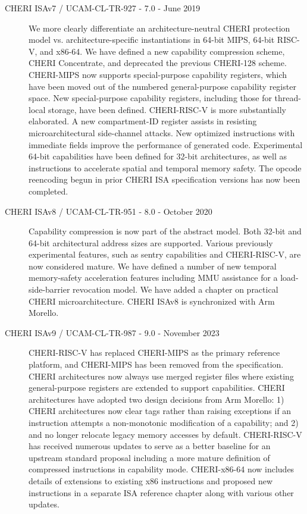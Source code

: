 \begin{description}
\item[CHERI ISAv7 / UCAM-CL-TR-927 - 7.0 - June 2019]
  We more clearly differentiate an archi\-tecture-neutral CHERI protection
  model vs. architecture-specific instantiations in 64-bit MIPS, 64-bit
  RISC-V, and x86-64.
  We have defined a new capability compression scheme, CHERI Concentrate, and
  deprecated the previous CHERI-128 scheme.
  CHERI-MIPS now supports special-purpose capability registers, which have
  been moved out of the numbered general-purpose capability register space.
  New special-purpose capability registers, including those for thread-local
  storage, have been defined.
  CHERI-RISC-V is more substantially elaborated.
  A new compartment-ID register assists in resisting microarchitectural
  side-channel attacks.
  New optimized instructions with immediate fields improve the performance of
  generated code.
  Experimental 64-bit capabilities have been defined for 32-bit architectures,
  as well as instructions to accelerate spatial and temporal memory safety.
  The opcode reencoding begun in prior CHERI ISA specification versions has
  now been completed.

\item[CHERI ISAv8 / UCAM-CL-TR-951 - 8.0 - October 2020]
  Capability compression is now part of the abstract model.
  Both 32-bit and 64-bit architectural address sizes are supported.
  Various previously experimental features, such as sentry capabilities and
  CHERI-RISC-V, are now considered mature. We have defined a number of new
  temporal memory-safety acceleration features including MMU assistance for a
  load-side-barrier revocation model.
  We have added a chapter on practical CHERI microarchitecture.
  CHERI ISAv8 is synchronized with Arm Morello.

\item[CHERI ISAv9 / UCAM-CL-TR-987 - 9.0 - November 2023]
  CHERI-RISC-V has replaced CHERI-MIPS as the primary reference
  platform, and CHERI-MIPS has been removed from the specification.
  CHERI architectures now always use merged register files where
  existing general-purpose registers are extended to support
  capabilities.
  CHERI architectures have adopted two design decisions from Arm
  Morello: 1) CHERI architectures now clear tags rather than raising
  exceptions if an instruction attempts a non-monotonic modification
  of a capability; and 2) \DDC{} and \PCC{} no longer relocate legacy
  memory accesses by default.
  CHERI-RISC-V has received numerous updates to serve as a better
  baseline for an upstream standard proposal including a more mature
  definition of compressed instructions in capability mode.
  CHERI-x86-64 now includes details of extensions to existing x86
  instructions and proposed new instructions in a separate ISA
  reference chapter along with various other updates.

\end{description}

